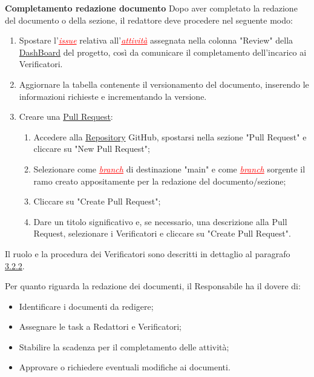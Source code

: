 \textbf{Completamento redazione documento}
Dopo aver completato la redazione del documento o della sezione, il redattore deve procedere nel seguente modo:
\begin{enumerate}
    \item Spostare l'\textcolor{red}{\uline{\textit{issue}}} relativa all'\textcolor{red}{\uline{\textit{attività}}} assegnata nella colonna "Review" della 
    \href{https://github.com/orgs/7Last/projects/1/views/1}{DashBoard} del progetto, così da comunicare il completamento dell'incarico ai Verificatori.
    \item Aggiornare la tabella contenente il versionamento del documento, inserendo le informazioni richieste e incrementando la versione.
    \item Creare una \href{#pull_request}{Pull Request}: 
    \begin{enumerate}
        \item Accedere alla \href{https://github.com/7Last/docs}{Repository} GitHub, spostarsi nella sezione "Pull Request" e cliccare su "New Pull Request";
        \item Selezionare come \textcolor{red}{\uline{\textit{branch}}} di destinazione "main" e come \textcolor{red}{\uline{\textit{branch}}} sorgente il ramo creato appositamente per la redazione del documento/sezione;
        \item Cliccare su "Create Pull Request";
        \item Dare un titolo significativo e, se necessario, una descrizione alla Pull Request, selezionare i Verificatori e cliccare su "Create Pull Request".
    \end{enumerate}
\end{enumerate}

Il ruolo e la procedura dei Verificatori sono descritti in dettaglio al paragrafo \href{#verifica_dei_documenti}{3.2.2}.

Per quanto riguarda la redazione dei documenti, il Responsabile ha il dovere di:
\begin{itemize}
    \item Identificare i documenti da redigere;
    \item Assegnare le task a Redattori e Verificatori;
    \item Stabilire la scadenza per il completamento delle attività;
    \item Approvare o richiedere eventuali modifiche ai documenti.
\end{itemize}

